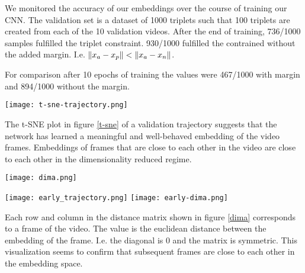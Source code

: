 
We monitored the accuracy of our embeddings over the course of training our CNN. The validation set is a dataset of 1000 triplets such that 100 triplets are created from each of the 10 validation videos. After the end of training, 736/1000 samples fulfilled the triplet constraint. 930/1000 fulfilled the contrained without the added margin. I.e. $\left\lVert x_a - x_p\right\rVert < \left\lVert x_a - x_n\right\rVert$.

For comparison after 10 epochs of training the values were 467/1000 with margin and 894/1000 without the margin.

{
    \centering
    \texttt{[image: t-sne-trajectory.png]}
    \label{t-sne}
    \vspace{0.25cm}
}

The t-SNE plot in figure \ref{t-sne} of a validation trajectory suggests that the network has learned a meaningful and well-behaved embedding of the video frames. Embeddings of frames that are close to each other in the video are close to each other in the dimensionality reduced regime.

{
    \centering
    \texttt{[image: dima.png]}
    \label{dima}
    \vspace{0.25cm}
}

{
    \centering
    \texttt{[image: early\_trajectory.png]}
    \label{early-t-sne}
    \vspace{0.25cm}
}
{
    \centering
    \texttt{[image: early-dima.png]}
    \label{early-dima}
    \vspace{0.25cm}
}

Each row and column in the distance matrix shown in figure \ref{dima} corresponds to a frame of the video. The value is the euclidean distance between the embedding of the frame. I.e. the diagonal is 0 and the matrix is symmetric. This visualization seems to confirm that subsequent frames are close to each other in the embedding space.

